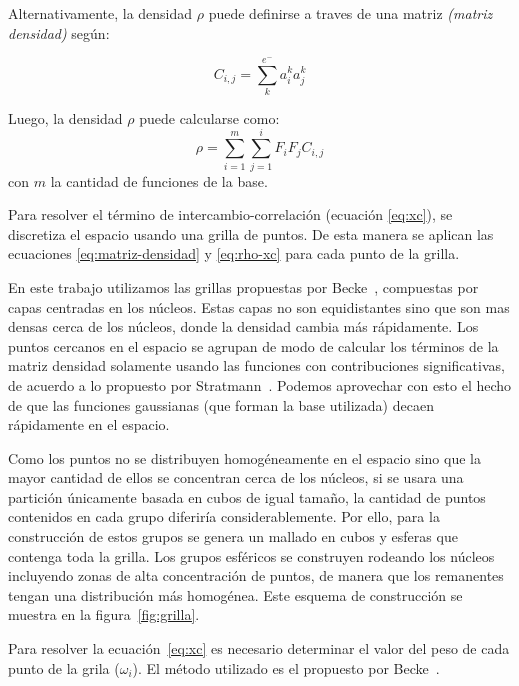 Alternativamente, la densidad $\rho$ puede definirse a traves de una matriz \textit{(matriz densidad)} seg\'un:

\begin{equation}
  \label{eq:matriz-densidad}
  C_{i,j} = \sum^{e^{-}}_k a^k_i a^k_j
\end{equation}

Luego, la densidad $\rho$ puede calcularse como:
\begin{equation}
  \label{eq:rho-xc}
  \rho = \sum^m_{i=1} \sum^i_{j=1} F_i F_j C_{i,j}
\end{equation}
con $m$ la cantidad de funciones de la base.

Para resolver el t\'ermino de intercambio-correlaci\'on (ecuaci\'on \ref{eq:xc}), se discretiza el espacio
usando una grilla de puntos. De esta manera se aplican las ecuaciones \ref{eq:matriz-densidad} y \ref{eq:rho-xc}
para cada punto de la grilla.

En este trabajo utilizamos las grillas propuestas por Becke~\cite{Becke}, compuestas por capas centradas en
los n\'ucleos. Estas capas no son equidistantes sino que son mas densas cerca de los n\'ucleos, donde la densidad
cambia m\'as r\'apidamente. Los puntos cercanos en el espacio se agrupan de modo de calcular los t\'erminos de la
matriz densidad solamente usando las funciones con contribuciones significativas, de acuerdo a lo propuesto por
Stratmann~\cite{Stratmann}. Podemos aprovechar con esto el hecho de que las funciones gaussianas (que forman la
base utilizada) decaen r\'apidamente en el espacio.

Como los puntos no se distribuyen homog\'eneamente en el espacio sino que la mayor cantidad de ellos
se concentran cerca de los n\'ucleos, si se usara una partici\'on \'unicamente basada en cubos de igual tama\~no, la cantidad
de puntos contenidos en cada grupo diferir\'ia considerablemente. Por ello, para la construcci\'on de estos grupos se genera un mallado en cubos
y esferas que contenga toda la grilla.  Los grupos esf\'ericos se construyen rodeando
los n\'ucleos incluyendo zonas de alta concentraci\'on de puntos, de manera que los remanentes
tengan una distribuci\'on m\'as homog\'enea. Este esquema de construcci\'on se muestra en la figura~\ref{fig:grilla}.

Para resolver la ecuaci\'on~\ref{eq:xc} es necesario determinar el valor del peso de cada punto de la grila ($\omega_i$). El
m\'etodo utilizado es el propuesto por Becke~\cite{Becke}.


